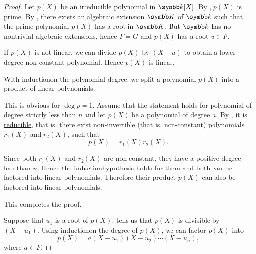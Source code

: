 \begin{proof}
   Let \( p(X) \) be an irreducible polynomial in \( \Bk[X] \). By , \( p(X) \) is prime. By , there exists an algebraic extension \( \BK \) of \( \Bk \) such that the prime polynomial \( p(X) \) has a root in \( \BK \). But \( \Bk \) has no nontrivial algebraic extensions, hence \( F = G \) and \( p(X) \) has a root \( u \in F \).

  If \( p(X) \) is not linear\LEM, we can divide \( p(X) \) by \( (X - u) \) to obtain a lower-degree non-constant polynomial. Hence \( p(X) \) is linear.

   With induction\IND on the polynomial degree, we split a polynomial \( p(X) \) into a product of linear polynomials.

  This is obvious for \( \deg p = 1 \). Assume that the statement holds for polynomial of degree strictly less than \( n \) and let \( p(X) \) be a polynomial of degree \( n \). By , it is \hyperref[def:irreducible_ring_element]{reducible}, that is, there exist non-invertible (that is, non-constant) polynomials \( r_1(X) \) and \( r_2(X) \), such that
  \begin{equation*}
    p(X) = r_1(X) r_2(X).
  \end{equation*}

  Since both \( r_1(X) \) and \( r_2(X) \) are non-constant, they have a positive degree less than \( n \). Hence the induction\IND hypothesis holds for them and both can be factored into linear polynomials. Therefore their product \( p(X) \) can also be factored into linear polynomials.

  This completes the proof.

   Suppose that \( u_1 \) is a root of \( p(X) \).  tells us that \( p(X) \) is divisible by \( (X - u_1) \). Using induction\IND on the degree of \( p(X) \), we can factor \( p(X) \) into
  \begin{equation*}
    p(X) = a (X - u_1) (X - u_2) \cdots (X - u_n),
  \end{equation*}
  where \( a \in F \).


\end{proof}
